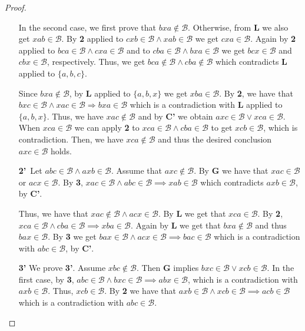 \documentclass[10pt,a4paper]{amsart}
\newcommand{\calb}{\mathcal{B}}
\begin{document}
\begin{proof}
\begin{enumerate}
		In the second case, we first prove that $ bxa\notin\calb$. Otherwise, from \textbf{L}  we  also get $xab\in\calb$. By \textbf{2} applied to $cxb\in\calb\land xab\in\calb$ we get $cxa\in\calb$. Again by \textbf{2} applied to $bca\in\calb\land cxa\in\calb$ and to $cba\in\calb\land bxa\in\calb$ we get $bcx\in\calb$ and $cbx\in\calb$, respectively. Thus, we get  $bca\notin\calb\land cba\notin\calb$ which contradicts \textbf{L} applied to $\{a,b,c\}$.
	
		Since $bxa\notin\calb$, by \textbf{L} applied to $\{a,b,x\}$ we get $xba\in\calb$.   By \textbf{2}, we have that $bxc\in\calb\land xac\in\calb\Rightarrow bxa\in\calb$ which is a contradiction with  \textbf{L} applied to $\{a,b,x\}$. Thus, we have $xac\notin\calb$ and by \textbf{C'} we obtain $axc\in\calb\lor xca\in\calb$. When $xca\in\calb$ we can apply \textbf{2} to $xca\in\calb\land cba\in\calb$ to get $xcb\in  \calb$, which is contradiction. Then, we have $xca\notin  \calb$ and thus the desired conclusion $axc\in  \calb$ holds.
	
		\item[\textbf{2'}\,] Let $abc\in  \calb\land axb\in  \calb$. Assume that $axc \notin  \calb$.   By \textbf{G} we have that $xac\in  \calb$ or $acx\in  \calb$.   By \textbf{3}, $xac\in  \calb\land abc\in  \calb\implies xab\in  \calb$ which contradicts $axb\in  \calb$, by \textbf{C'}.
	
		Thus, we have that $xac\notin\calb\land acx\in  \calb$.   By \textbf{L} we get that $xca\in  \calb$.   By \textbf{2},  $xca\in  \calb\land cba\in\calb\implies xba\in  \calb$. Again by \textbf{L} we get that $bxa\notin  \calb$ and thus $bax\in  \calb$.   By \textbf{3} we get $bax\in  \calb\land acx\in  \calb\implies bac\in  \calb$ which is a contradiction with $abc\in  \calb$, by \textbf{C'}.
	
		\item[\textbf{3'}]  We prove \textbf{3'}. Assume $ xbc \notin  \calb$. Then \textbf{G} implies $bxc\in  \calb\lor xcb\in  \calb$. In the first case, by \textbf{3}, $abc\in  \calb\land bxc\in  \calb\implies abx\in  \calb$, which is a contradiction with $axb\in  \calb$. Thus, $xcb\in  \calb$.   By \textbf{2} we have that $axb\in  \calb\land xcb\in  \calb\implies acb\in  \calb$ which is a contradiction with $abc\in  \calb$.
        
        
	\end{enumerate}
 \end{proof}
\end{document}
